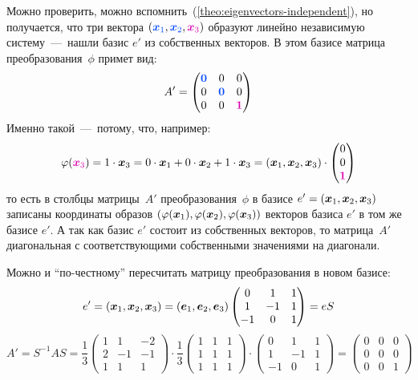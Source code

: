 \documentclass[a4paper,12pt]{article}
\begin{document}
\begin{solution}
    Можно проверить, можно вспомнить~(\ref{theo:eigenvectors-independent}), но получается, что три вектора $(\textcolor{blue}{\bds x_1}, \textcolor{blue}{\bds x_2}, \textcolor{pink}{\bds x_3})$ образуют линейно независимую систему~---~нашли базис $e'$ из собственных векторов.
    В этом базисе матрица преобразования~$\phi$ примет вид:
    \[
      A' = \begin{pmatrix}
        \textcolor{blue}{\bds 0} & 0                        & 0\\
        0                        & \textcolor{blue}{\bds 0} & 0\\
        0                        & 0                        & \textcolor{pink}{\bds 1}
      \end{pmatrix}
    \]
    Именно такой~---~потому, что, например:
    \[
      \phi(\textcolor{pink}{\bds x_3}) \hm= 1 \hm\cdot \bds x_3 \hm= 0 \hm\cdot \bds x_1 \hm+ 0 \hm\cdot \bds x_2 \hm+ 1 \hm\cdot \bds x_3 \hm= (\bds x_1, \bds x_2, \bds x_3) \hm\cdot \begin{pmatrix}0 \\ 0 \\ \textcolor{pink}{\bds 1}\end{pmatrix}
    \]
    то есть в столбцы матрицы~$A'$ преобразования~$\phi$ в базисе $e' \hm= (\bds x_1, \bds x_2, \bds x_3)$ записаны координаты образов $(\varphi(\boldsymbol x_1), \varphi(\boldsymbol x_2), \varphi(\boldsymbol x_3))$ векторов базиса $e'$ в том же базисе $e'$.
    А так как базис $e'$ состоит из собственных векторов, то матрица~$A'$ диагональная с соответствующими собственными значениями на диагонали.
    
    Можно и ``по-честному'' пересчитать матрицу преобразования в новом базисе:
    \[
      e' = (\boldsymbol x_1, \boldsymbol x_2, \boldsymbol x_3) = (\boldsymbol e_1, \boldsymbol e_2, \boldsymbol e_3) \begin{pmatrix}
        0  & 1  & 1\\
        1  & -1 & 1\\
        -1 & 0  & 1
      \end{pmatrix} = e S
    \]
    \[
      A' = S^{-1} A S = \frac{1}{3} \begin{pmatrix}
        1 & 1 & -2\\
        2 & -1 & -1\\
        1 & 1 & 1
      \end{pmatrix} \cdot \frac{1}{3} \begin{pmatrix}
        1 & 1 & 1\\
        1 & 1 & 1\\
        1 & 1 & 1
      \end{pmatrix} \cdot \begin{pmatrix}
        0  & 1  & 1\\
        1  & -1 & 1\\
        -1 & 0  & 1
      \end{pmatrix} = \begin{pmatrix}
        0 & 0 & 0\\
        0 & 0 & 0\\
        0 & 0 & 1
      \end{pmatrix}
    \]
  \end{solution}
  
  
  
\end{document}
